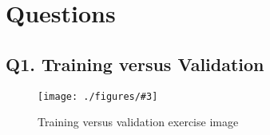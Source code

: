\documentclass[unicode, 11pt, a4paper]{scrartcl}
\newcommand{\myFigure}[3]{
    \begin{figure}[htbp]
    \centering
    \caption{#1}
    \label{#2}
    \texttt{[image: ./figures/\#3]}
    \end{figure}
}
\begin{document}
\section*{Questions}

\subsection*{Q1. Training versus Validation}

\myFigure{Training versus validation exercise image}
{fig:ex-q1-training-vs-validation}
{ex_train_val_test.png}
\end{document}
